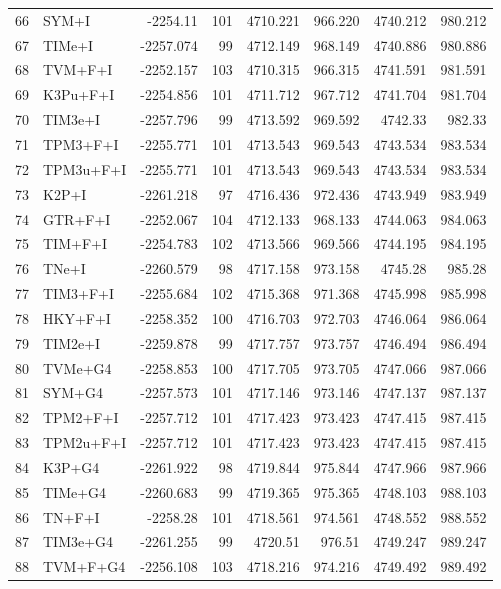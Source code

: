 \documentclass[12pt]{article}
\begin{document}
\begin{longtable}{clrrrrrr}
	66 & SYM+I & -2254.11 & 101 & 4710.221 & 966.220 & 4740.212 & 980.212 \\ 
	67 & TIMe+I & -2257.074 & 99 & 4712.149 & 968.149 & 4740.886 & 980.886 \\ 
	68 & TVM+F+I & -2252.157 & 103 & 4710.315 & 966.315 & 4741.591 & 981.591 \\ 
	69 & K3Pu+F+I & -2254.856 & 101 & 4711.712 & 967.712 & 4741.704 & 981.704 \\ 
	70 & TIM3e+I & -2257.796 & 99 & 4713.592 & 969.592 & 4742.33 & 982.33 \\ 
	71 & TPM3+F+I & -2255.771 & 101 & 4713.543 & 969.543 & 4743.534 & 983.534 \\ 
	72 & TPM3u+F+I & -2255.771 & 101 & 4713.543 & 969.543 & 4743.534 & 983.534 \\ 
	73 & K2P+I & -2261.218 & 97 & 4716.436 & 972.436 & 4743.949 & 983.949 \\ 
	74 & GTR+F+I & -2252.067 & 104 & 4712.133 & 968.133 & 4744.063 & 984.063 \\ 
	75 & TIM+F+I & -2254.783 & 102 & 4713.566 & 969.566 & 4744.195 & 984.195 \\ 
	76 & TNe+I & -2260.579 & 98 & 4717.158 & 973.158 & 4745.28 & 985.28 \\ 
	77 & TIM3+F+I & -2255.684 & 102 & 4715.368 & 971.368 & 4745.998 & 985.998 \\ 
	78 & HKY+F+I & -2258.352 & 100 & 4716.703 & 972.703 & 4746.064 & 986.064 \\ 
	79 & TIM2e+I & -2259.878 & 99 & 4717.757 & 973.757 & 4746.494 & 986.494 \\ 
	80 & TVMe+G4 & -2258.853 & 100 & 4717.705 & 973.705 & 4747.066 & 987.066 \\ 
	81 & SYM+G4 & -2257.573 & 101 & 4717.146 & 973.146 & 4747.137 & 987.137 \\ 
	82 & TPM2+F+I & -2257.712 & 101 & 4717.423 & 973.423 & 4747.415 & 987.415 \\ 
	83 & TPM2u+F+I & -2257.712 & 101 & 4717.423 & 973.423 & 4747.415 & 987.415 \\ 
	84 & K3P+G4 & -2261.922 & 98 & 4719.844 & 975.844 & 4747.966 & 987.966 \\ 
	85 & TIMe+G4 & -2260.683 & 99 & 4719.365 & 975.365 & 4748.103 & 988.103 \\ 
	86 & TN+F+I & -2258.28 & 101 & 4718.561 & 974.561 & 4748.552 & 988.552 \\ 
	87 & TIM3e+G4 & -2261.255 & 99 & 4720.51 & 976.51 & 4749.247 & 989.247 \\ 
	88 & TVM+F+G4 & -2256.108 & 103 & 4718.216 & 974.216 & 4749.492 & 989.492 \\ 

\end{longtable}
\end{document}
